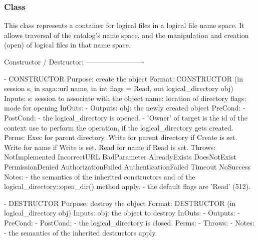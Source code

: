  
  \subsubsection*{Class }
 
    This class represents a container for logical files in a
    logical file name space.  It allows traversal of the
    catalog's name space, and the manipulation and creation
    (open) of logical files in that name space.
    
 \begin{myspec}
    Constructor / Destructor:
    -------------------------
 
    - CONSTRUCTOR
      Purpose:  create the object
      Format:   CONSTRUCTOR      (in  session       s,
                                  in  saga::url     name,
                                  in  int           flags = Read,
                                  out logical_directory
                                                    obj)
      Inputs:   s:                session to associate with
                                  the object
                name:             location of directory
                flags:            mode for opening
      InOuts:   -
      Outputs:  obj:              the newly created object
      PreCond:  -
      PostCond: - the logical_directory is opened.
                - 'Owner' of target is the id of the context
                  use to perform the operation, if the
                  logical_directory gets created.
      Perms:    Exec  for parent directory.
                Write for parent directory if Create is set.
                Write for name if Write is set.
                Read  for name if Read  is set.
      Throws:   NotImplemented
                IncorrectURL
                BadParameter
                AlreadyExists
                DoesNotExist
                PermissionDenied
                AuthorizationFailed
                AuthenticationFailed
                Timeout
                NoSuccess
      Notes:    - the semantics of the inherited constructors
                  and of the logical_directory::open_dir()
                  method apply.
                - the default flags are 'Read' (512).
 
 
    - DESTRUCTOR
      Purpose:  destroy the object
      Format:   DESTRUCTOR         (in  logical_directory obj)
      Inputs:   obj:                the object to destroy
      InOuts:   -
      Outputs:  -
      PreCond:  -
      PostCond: - the logical_directory is closed.
      Perms:    -
      Throws:   -
      Notes:    - the semantics of the inherited destructors
                  apply.
 

\end{myspec}
